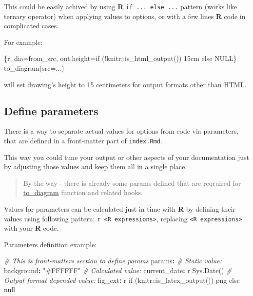 \documentclass[
  12pt,
  a4paper,
  12pt,
  oneside,
  openany]{book}
\newenvironment{Shaded}{\begin{snugshade}}{\end{snugshade}}
\newcommand{\AttributeTok}[1]{\textcolor[rgb]{0.61,0.61,0.61}{#1}}
\newcommand{\CommentTok}[1]{\textcolor[rgb]{0.37,0.37,0.37}{\textit{#1}}}
\newcommand{\DataTypeTok}[1]{\textcolor[rgb]{0.27,0.27,0.27}{#1}}
\newcommand{\FunctionTok}[1]{\textcolor[rgb]{0,0,0}{#1}}
\newcommand{\KeywordTok}[1]{\textcolor[rgb]{0.27,0.27,0.27}{\textbf{#1}}}
\newcommand{\StringTok}[1]{\textcolor[rgb]{0.5,0.5,0.5}{#1}}
\begin{document}
This could be easily achived by using \textbf{R} \texttt{if\ ...\ else\ ...} pattern (works like ternary operator) when applying values to options, or with a few lines \textbf{R} code in complicated cases.

For example:

\begin{Shaded}
\begin{Highlighting}[]
\StringTok{\textasciigrave{}\textasciigrave{}\textasciigrave{}}\DataTypeTok{\{r, dia=\textquotesingle{}from\_src\textquotesingle{}, out.height=if (!knitr::is\_html\_output()) \textquotesingle{}15cm\textquotesingle{} else NULL\}}
\DataTypeTok{to\_diagram(src=\textquotesingle{}...\textquotesingle{})}
\StringTok{\textasciigrave{}\textasciigrave{}\textasciigrave{}}
\end{Highlighting}
\end{Shaded}

will set drawing's height to 15 centimeters for output formats other than HTML.

\hypertarget{usage-customize-params}{%
\subsection{Define parameters}\label{usage-customize-params}}

There is a way to separate actual values for options from code via parameters, that are defined in a front‑matter part of \texttt{index.Rmd}.

This way you could tune your output or other aspects of your documentation just by adjusting those values and keep them all in a single place.

\begin{quote}
By the way - there is already some params defined that are reqruired for \protect\hyperlink{usage-spec}{to\_diagram} function and related hooks.
\end{quote}

Values for parameters can be calculated just in time with \textbf{R} by defining their values using following pattern: \texttt{\textasciigrave{}r\ \textless{}R\ expressions\textgreater{}\textasciigrave{}}, replacing \texttt{\textless{}R\ expressions\textgreater{}} with your \textbf{R} code.

Parameters definition example:

\begin{Shaded}
\begin{Highlighting}[]
\CommentTok{\# This is front{-}matter\textquotesingle{}s section to define params}
\FunctionTok{params}\KeywordTok{:}
\CommentTok{  \# Static value:}
\AttributeTok{  }\FunctionTok{background}\KeywordTok{:}\AttributeTok{ }\StringTok{"\#FFFFFF"}
\CommentTok{  \# Calculated value:}
\AttributeTok{  }\FunctionTok{current\_date}\KeywordTok{:}\AttributeTok{ \textasciigrave{}r Sys.Date()\textasciigrave{}}
\CommentTok{  \# Output format depended value:}
\AttributeTok{  }\FunctionTok{fig\_ext}\KeywordTok{:}\AttributeTok{ \textasciigrave{}r if (knitr::is\_latex\_output()) \textquotesingle{}png\textquotesingle{} else null\textasciigrave{}}
\end{Highlighting}
\end{Shaded}
\end{document}
